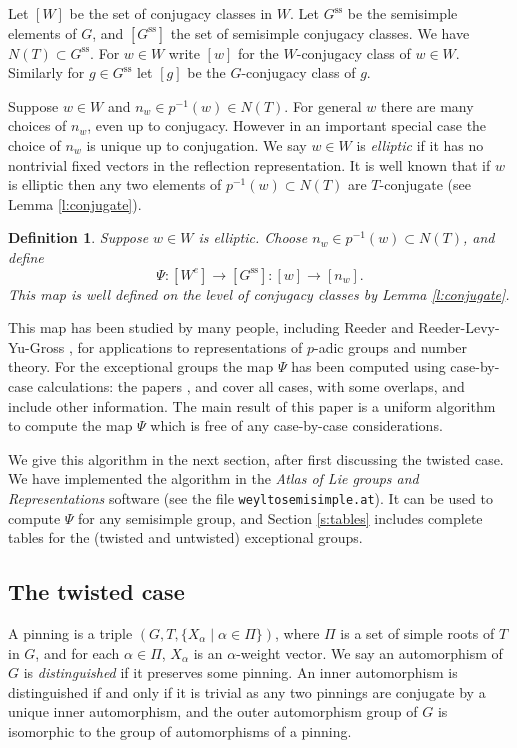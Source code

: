 \documentclass[10pt,leqno]{article}
\newtheorem{definition}[equation]{Definition}
\newcommand{\subsec}[1]{\subsection{#1}
\renewcommand{\theequation}{\thesubsection.\arabic{equation}}}
\newcommand\inv{^{-1}}
\newcommand{\Wconj}{[W]}
\newcommand{\Weconj}{[{W^e}]}
\newcommand{\Gssconj}{[{G^\text{ss}}]}
\renewcommand{\ss}{\text{ss}}
\newcommand{\Gss}{G^\ss}
\begin{document}
Let $\Wconj$ be the set of conjugacy classes in $W$. Let $\Gss$ be the
semisimple elements of $G$, and $\Gssconj$ the set of semisimple
conjugacy classes. We have $N(T)\subset \Gss$. For $w\in W$ write $[w]$ for the $W$-conjugacy
class of $w\in W$. Similarly for $g\in \Gss$ let $[g]$ be the
$G$-conjugacy class of $g$.

Suppose $w\in W$ and $n_w\in p\inv(w)\in N(T)$. For general $w$ there
are many choices of $n_w$, even up to conjugacy.  However in an
important special case the choice of $n_w$ is unique up to
conjugation. We say $w\in W$ is {\it elliptic} if it has no nontrivial fixed
vectors in the reflection representation.  It is well known that if
$w$ is elliptic then any two elements of $p\inv(w)\subset N(T)$ are
$T$-conjugate (see Lemma \ref{l:conjugate}). 

\begin{definition}
\label{d:basic}
Suppose $w\in W$ is elliptic.
Choose $n_w\in p\inv(w)\subset N(T)$, and define
$$
\Psi: \Weconj\rightarrow\Gssconj: [w]\rightarrow [n_w].
$$
This map is well defined on the level of conjugacy classes by Lemma \ref{l:conjugate}.
\end{definition}


This map has been studied by many people, including Reeder
\cite{reeder_torsion} and Reeder-Levy-Yu-Gross \cite{rgly}, for
applications to representations of $p$-adic groups and number theory.
For the exceptional groups the map $\Psi$ has been computed using
case-by-case calculations: the papers \cite{levy_exceptional}, \cite{bouwknegt}
and \cite{rgly} cover all cases, with some overlaps, and include other
information. The main result of this paper is a uniform algorithm to compute
the map $\Psi$ which is free of any case-by-case considerations.

We give this algorithm in the next section, after first discussing the
twisted case. We have implemented the algorithm in the {\it Atlas of
  Lie groups and Representations} software \cite{atlas_software} (see
the file {\tt weyltosemisimple.at}). It can be used to compute $\Psi$
for any semisimple group, and Section \ref{s:tables} includes  complete tables for the
(twisted and untwisted) exceptional groups.

\subsec{The twisted case}
\label{s:twisted}

A pinning is a triple $(G,T,\{X_\alpha\mid \alpha\in\Pi\})$,
where $\Pi$ is a set of simple roots of $T$ in $G$, and for each
$\alpha\in\Pi$, $X_\alpha$ is an $\alpha$-weight vector.  
We say an automorphism of $G$ is {\it distinguished} if it preserves some pinning.  An
inner automorphism is distinguished if and only if it is trivial as
any two pinnings are conjugate by a unique inner automorphism,
and the
outer automorphism group of $G$ is isomorphic to the group of
automorphisms of a pinning.
\end{document}
